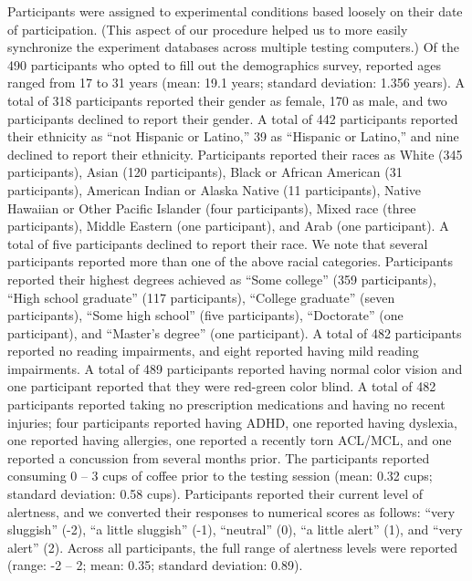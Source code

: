 \documentclass[11pt]{article}
\begin{document}
Participants were assigned to experimental conditions based loosely on their
date of participation. (This aspect of our procedure helped us to more easily
synchronize the experiment databases across multiple testing computers.) Of the
490 participants who opted to fill out the demographics survey, reported ages
ranged from 17 to 31 years (mean: 19.1 years; standard deviation: 1.356 years).
A total of 318 participants reported their gender as female, 170 as male, and
two participants declined to report their gender. A total of 442 participants
reported their ethnicity as ``not Hispanic or Latino,'' 39 as ``Hispanic or
Latino,'' and nine declined to report their ethnicity. Participants reported
their races as White (345 participants), Asian (120 participants), Black or
African American (31 participants), American Indian or Alaska Native (11
participants), Native Hawaiian or Other Pacific Islander (four participants),
Mixed race (three participants), Middle Eastern (one participant), and Arab
(one participant). A total of five participants declined to report their race.
We note that several participants reported more than one of the above racial
categories. Participants reported their highest degrees achieved as ``Some
college'' (359 participants), ``High school graduate'' (117 participants),
``College graduate'' (seven participants), ``Some high school'' (five
participants), ``Doctorate'' (one participant), and ``Master's degree'' (one
participant). A total of 482 participants reported no reading impairments, and
eight reported having mild reading impairments. A total of 489 participants
reported having normal color vision and one participant reported that they were
red-green color blind. A total of 482 participants reported taking no
prescription medications and having no recent injuries; four participants
reported having ADHD, one reported having dyslexia, one reported having
allergies, one reported a recently torn ACL/MCL, and one reported a concussion
from several months prior. The participants reported consuming 0 -- 3 cups of
coffee prior to the testing session (mean: 0.32 cups; standard deviation: 0.58
cups). Participants reported their current level of alertness, and we converted
their responses to numerical scores as follows: ``very sluggish'' (-2), ``a
little sluggish'' (-1), ``neutral'' (0), ``a little alert'' (1), and ``very
alert'' (2). Across all participants, the full range of alertness levels were
reported (range: -2 -- 2; mean: 0.35; standard deviation: 0.89).
\end{document}
